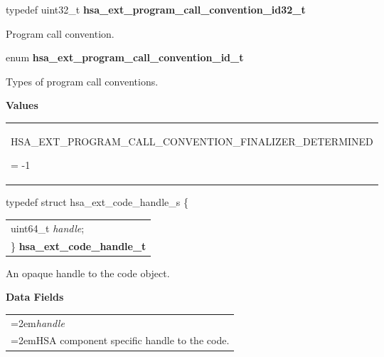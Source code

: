 \documentclass[final]{book}
\newcommand{\reffld}[1]{\textit{#1}}
\newcommand{\reftyp}[1]{#1}
\newcommand{\refenu}[1]{\reftyp{#1}}
\begin{document}
\noindent\begin{tcolorbox}[nobeforeafter,arc=0mm,colframe=white,colback=lightgray,left=0mm]
typedef uint32_t  \hypertarget{group__FinalizerCoreApi_1gad4afadfa0983f1bc637f3add3a006cba}{\textbf{hsa_ext_program_call_convention_id32_t}}
\end{tcolorbox}
Program call convention.
\\

\noindent\begin{tcolorbox}[breakable,nobeforeafter,arc=0mm,colframe=white,colback=lightgray,left=0mm]
enum \hypertarget{group__FinalizerCoreApi_1gad40f97fe8e2356f3a58c3073f12cf5ad}{\textbf{hsa_ext_program_call_convention_id_t}}
\end{tcolorbox}
Types of program call conventions.

\noindent\textbf{Values}\\[-5mm]
\begin{longtable}{@{\hspace{2em}}p{\linewidth-2em}}
\hspace{-2em}\hypertarget{group__FinalizerCoreApi_1ggad40f97fe8e2356f3a58c3073f12cf5ada644970a843ed5c5f6f48b524e42c95c3}{\refenu{HSA_EXT_PROGRAM_CALL_CONVENTION_FINALIZER_DETERMINED}} = -1
\end{longtable}

\noindent\begin{tcolorbox}[breakable,nobeforeafter,arc=0mm,colframe=white,colback=lightgray,left=0mm]
typedef struct  hsa_ext_code_handle_s \{
\vspace{-3.5mm}\begin{longtable}{@{}p{\textwidth}}
\hspace{1.7em}uint64_t \reffld{handle};\\
\}  \hypertarget{group__FinalizerCoreApi_1ga5aeece3297b7102d33a2815a368103f7}{\textbf{hsa_ext_code_handle_t}}
\end{longtable}

\end{tcolorbox}
An opaque handle to the code object.

\noindent\textbf{Data Fields}\\[-6mm]
\begin{longtable}{@{}>{\hangindent=2em}p{\textwidth}}
\reffld{handle}\\\hspace{2em}HSA component specific handle to the code.
\end{longtable}
\end{document}

